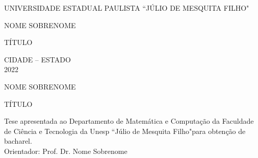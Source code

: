 \documentclass[12pt,nodisplayskipstretch]{article}
\newenvironment{natureza}{\hspace{59mm}\begin{minipage}[c]{95mm}\begin{justify}}{\end{justify}\end{minipage}}
\newcommand{\titulo}{\uppercase{Título}}
\begin{document}

\thispagestyle{empty}
\begin{center}
    \uppercase{Universidade Estadual Paulista ``Júlio de Mesquita Filho"}
\end{center}

\vspace{4cm}

\begin{center}
    \uppercase{Nome Sobrenome}
\end{center}

\vspace{5cm}

\begin{center}
    \titulo
\end{center}

\vspace*{\fill}

\begin{center}
    \uppercase{Cidade -- Estado\\2022}
\end{center}


\newpage

\thispagestyle{empty}

\begin{center}
    \uppercase{Nome Sobrenome}
\end{center}

\vspace{5cm}

\begin{center}
    \titulo
\end{center}

\vspace{5cm}

\begin{natureza}
\noindent Tese apresentada ao Departamento de Matemática e Computação da Faculdade de Ciência e Tecnologia da Unesp ``Júlio de Mesquita Filho"\;para obtenção de bacharel.\\
Orientador: Prof. Dr. Nome Sobrenome
\end{natureza}

\vspace*{\fill}
\end{document}
